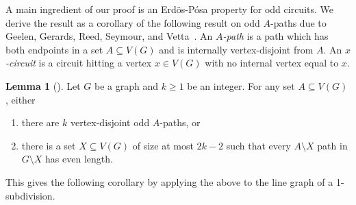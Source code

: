 \documentclass{article}
\theoremstyle{definition}
\newtheorem{lemma}[environment]{Lemma}
\begin{document}
A main ingredient of our proof is an Erd\"{o}s-P\'{o}sa property for odd circuits. We derive the result as a corollary of the following result on odd $A$-paths due to Geelen, Gerards, Reed, Seymour, and Vetta~\cite{Geelen2009oddMinor}. An \emph{$A$-path} is a path which has both endpoints in a set $A \subseteq V(G)$ and is internally vertex-disjoint from $A$. An \emph{$x$-circuit} is a circuit hitting a vertex $x \in V(G)$ with no internal vertex equal to $x$.

\begin{lemma}[{\cite[Lemma~11]{Geelen2009oddMinor}}]\label{lem:OddPathsEP}
    Let $G$ be a graph and $k \geq 1$ be an integer. For any set $A \subseteq V(G)$, either
    \begin{enumerate}
        \item there are $k$ vertex-disjoint odd $A$-paths, or
        \item there is a set $X \subseteq V(G)$ of size at most $2k-2$ such that every $A \setminus X$ path in $G\setminus X$ has even length.
    \end{enumerate}
\end{lemma}

This gives the following corollary by applying the above to the line graph of a 1-subdivision.
\end{document}
